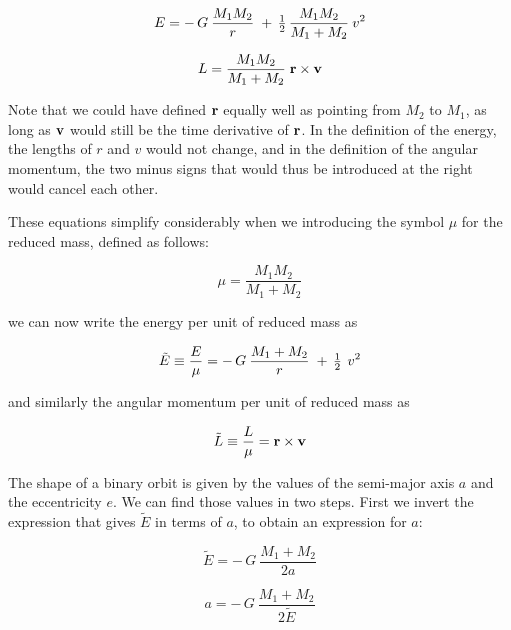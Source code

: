 \begin{equation}
E = -\, G\:\frac{M_1 M_2}{r} \;+\, {\textstyle\frac{1}{2}}\,\frac{M_1 M_2}{M_1 + M_2}\:v^2
\end{equation}

\begin{equation}
L = \frac{M_1 M_2}{M_1 + M_2} \; {\bf r} \times {\bf v}
\end{equation}

\noindent
Note that we could have defined ${\bf r}$ equally well as pointing from
$M_2$ to $M_1$, as long as ${\bf v}$ would still be the time derivative of
${\bf r}$.  In the definition of the energy, the lengths of $r$ and $v$
would not change, and in the definition of the angular momentum, the
two minus signs that would thus be introduced at the right would
cancel each other.

These equations simplify considerably when we introducing the symbol
$\mu$ for the reduced mass, defined as follows:

\begin{equation}
\mu = \frac{M_1 M_2}{M_1 + M_2}
\end{equation}

\noindent
we can now write the energy per unit of reduced mass as

\begin{equation}
\tilde E  \equiv \frac{E}{\mu} = -\, G\:\frac{M_1 + M_2}{r} \;+\, {\textstyle\frac{1}{2}}\,\:v^2
\end{equation}

\noindent
and similarly the angular momentum per unit of reduced mass as

\begin{equation}
\tilde L \equiv \frac{L}{\mu}  =  {\bf r} \times {\bf v}
\end{equation}

\abc

\alice
The shape of a binary orbit is given by the values of the semi-major
axis $a$ and the eccentricity $e$.  We can find those values in two steps.
First we invert the expression that gives $\tilde E$ in terms of $a$,
to obtain an expression for $a$:

\cba

\begin{equation}
\tilde E = -\, G\:\frac{M_1 + M_2}{2 a}
\end{equation}

\begin{equation}
a = -\, G\:\frac{M_1 + M_2}{2 \tilde E}\label{eq:a}
\end{equation}

